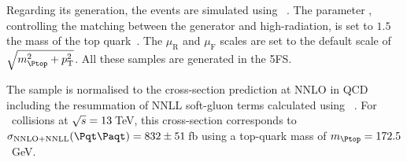 
Regarding its generation, the \ttbar events are simulated using 
\POWHEGBOX[v2]~\cite{Frixione:2007nw, Nason:2004rx, Frixione:2007vw, Alioli:2010xd}.
The parameter \hdamp, controlling 
the matching between the \POWHEG generator and high-\pT radiation, is set to 
 $1.5$ the mass of the top quark~\cite{ATL-PHYS-PUB-2016-020}.
The $\mu_{\text{R}}$  and $\mu_{\text{F}}$ scales are set to the default scale of \(\sqrt{\mtop^{2} + \pT^{2}}\).
All these samples are generated in the 5FS.




\begin{comment} %
The uncertainty due to ISR is estimated 
by comparing the nominal \ttbar events using the A14 tune with \ttbar events with the same 
settings as the nominal ones, but employed the \texttt{Var3c up} or \texttt{down} variation 
of the A14 tune, which corresponds to the variation of \alphas for ISR in the A14 
tune~\cite{ATL-PHYS-PUB-2014-021}. The uncertainty due to FSR 
is evaluated by varying the $\mu_{\text{R}}$ scale for emissions from the PS up and down by a 
factor of two.
\end{comment}

The \ttbar sample is normalised to the cross-section prediction at NNLO
in QCD including the resummation of NNLL soft-gluon terms calculated using
\TOPpp[2.0]~\cite{Beneke:2011mq,Cacciari:2011hy,Baernreuther:2012ws,Czakon:2012zr,Czakon:2012pz,Czakon:2011xx}.
For \pp\ collisions at \(\sqrt{s} = 13\,\)TeV, this cross-section corresponds to
\(\sigma_{\text{NNLO+NNLL}} (\ttbar)= 832 \pm 51\,\)fb using a top-quark mass of $\mtop = 172.5$~GeV.



